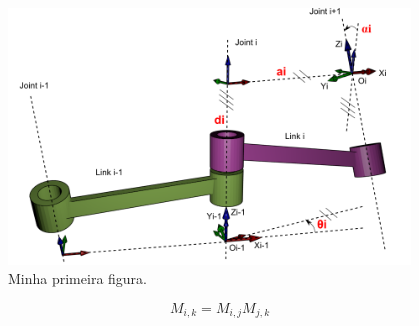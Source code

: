 \begin{figure}[htbp]
    \centering
        \includegraphics[width=0.95\textwidth]{imagens/dh.png}
    \caption{Minha primeira figura.}
    \label{fig:Figura1}
\end{figure}

\begin{equation}
M_{i,k}= M_{i,j} M_{j,k}
\end{equation}